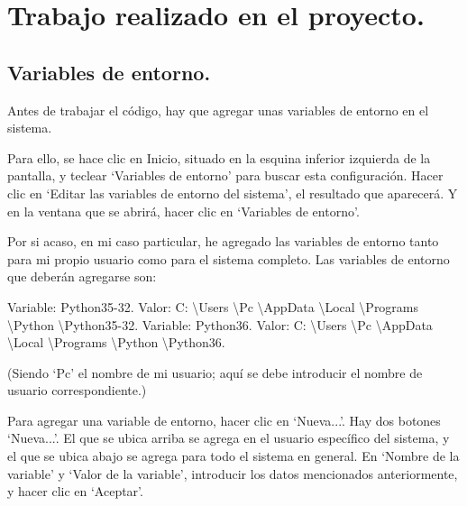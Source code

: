 \section{Trabajo realizado en el proyecto.}

\subsection{Variables de entorno.}

Antes de trabajar el código, hay que agregar unas variables de entorno en el sistema.

Para ello, se hace clic en Inicio, situado en la esquina inferior izquierda de la pantalla, y teclear ‘Variables de entorno’ para buscar esta configuración. Hacer clic en ‘Editar las variables de entorno del sistema’, el resultado que aparecerá. Y en la ventana que se abrirá, hacer clic en ‘Variables de entorno’.

Por si acaso, en mi caso particular, he agregado las variables de entorno tanto para mi propio usuario como para el sistema completo. Las variables de entorno que deberán agregarse son:

Variable: Python35-32. Valor: C: \textbackslash Users \textbackslash Pc \textbackslash AppData \textbackslash Local \textbackslash Programs \textbackslash Python \textbackslash Python35-32.
Variable: Python36. Valor: C: \textbackslash Users \textbackslash Pc \textbackslash AppData \textbackslash Local \textbackslash Programs \textbackslash Python \textbackslash Python36.

(Siendo ‘Pc’ el nombre de mi usuario; aquí se debe introducir el nombre de usuario correspondiente.)

Para agregar una variable de entorno, hacer clic en ‘Nueva...’. Hay dos botones ‘Nueva...’. El que se ubica arriba se agrega en el usuario específico del sistema, y el que se ubica abajo se agrega para todo el sistema en general. En ‘Nombre de la variable’ y ‘Valor de la variable’, introducir los datos mencionados anteriormente, y hacer clic en ‘Aceptar’.

